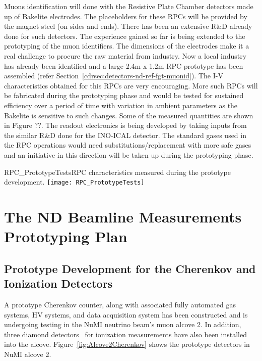 Muons identification will done with the Resistive Plate Chamber detectors made up of Bakelite electrodes. 
The placeholders for these RPCs will be provided by the magnet steel (on sides and ends). There has been an 
extensive R\&D already done for such detectors. The experience gained so far is being extended to the 
prototyping of the muon identifiers. The dimensions of the electrodes make it a real challenge to procure 
the raw material from industry. Now a local industry has already been identified and a large 2.4m x 1.2m RPC 
prototype has been assembled (refer Section~\ref{cdrsec:detectors-nd-ref-fgt-muonid}). The I-V characteristics 
obtained for this RPCs are very encouraging. More such RPCs will be fabricated during the prototyping phase 
and would be tested for sustained efficiency over a period of time with variation in ambient parameters 
as the Bakelite is sensitive to such changes. Some of the measured quantities are shown in Figure ??. 
The readout electronics is being developed by taking inputs from the similar R\&D done for the 
INO-ICAL detector. The standard gases used in the RPC operations would need substitutions/replacement 
with more safe gases and an initiative in this direction will be taken up during the prototyping phase.

\begin{cdrfigure}  
{RPC_PrototypeTests}{RPC characteristics measured during the prototype development.}  
\texttt{[image: RPC\_PrototypeTests]}
\end{cdrfigure}







\section{The ND Beamline Measurements Prototyping Plan} 
\label{sec:proto-nd-blm}

\subsection{Prototype Development for the Cherenkov and Ionization Detectors}
\label{subsec:proto-blm-muon-cherenkov-proto}

A prototype Cherenkov counter, along with associated fully automated gas systems,
HV systems, and data acquisition system has been constructed and is undergoing
testing in the NuMI neutrino beam's muon alcove 2. In addition, three diamond
detectors~\cite{ref:CERNdiamond} for ionization measurements have also been installed into the alcove.
Figure~\ref{fig:Alcove2Cherenkov} shows the prototype detectors in NuMI alcove 2.

